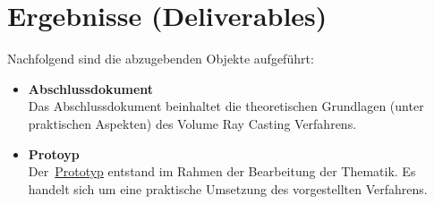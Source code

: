 \section{Ergebnisse (Deliverables)}
\label{sec:deliverables}

Nachfolgend sind die abzugebenden Objekte aufgeführt:
\begin{itemize}
    \item \textbf{Abschlussdokument} \\
        Das Abschlussdokument beinhaltet die theoretischen Grundlagen
        (unter praktischen Aspekten) des Volume Ray Casting Verfahrens.
    \item \textbf{Protoyp} \\
        Der~\hyperref[chap:prototype]{Prototyp} entstand im Rahmen der
        Bearbeitung der Thematik. Es handelt sich um eine praktische
        Umsetzung des vorgestellten
        Verfahrens.
\end{itemize}
